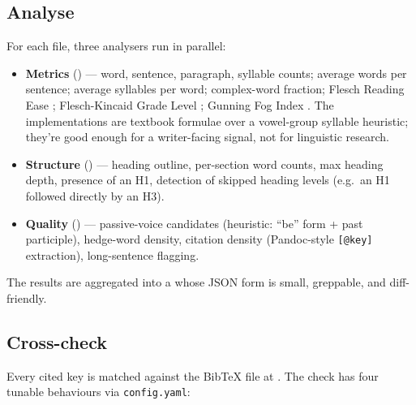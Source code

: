 \documentclass[
  english,
]{article}
\begin{document}
\subsection{Analyse}\label{analyse}

For each file, three analysers run in parallel:

\begin{itemize}
\item
  \textbf{Metrics} () ---
  word, sentence, paragraph, syllable counts; average words per
  sentence; average syllables per word; complex-word fraction; Flesch
  Reading Ease \citep{flesch1948new}; Flesch-Kincaid Grade Level
  \citep{kincaid1975derivation}; Gunning Fog Index
  \citep{gunning1952technique}. The implementations are textbook
  formulae over a vowel-group syllable heuristic; they're good enough
  for a writer-facing signal, not for linguistic research.
\item
  \textbf{Structure} ()
  --- heading outline, per-section word counts, max heading depth,
  presence of an H1, detection of skipped heading levels (e.g.~an H1
  followed directly by an H3).
\item
  \textbf{Quality} () ---
  passive-voice candidates (heuristic: ``be'' form + past participle),
  hedge-word density, citation density (Pandoc-style \texttt{{[}@key{]}}
  extraction), long-sentence flagging.
\end{itemize}

The results are aggregated into a  whose JSON
form is small, greppable, and diff-friendly.

\subsection{Cross-check}\label{cross-check}

Every cited key is matched against the BibTeX file at
. The check has four tunable
behaviours via \texttt{config.yaml}:
\end{document}

